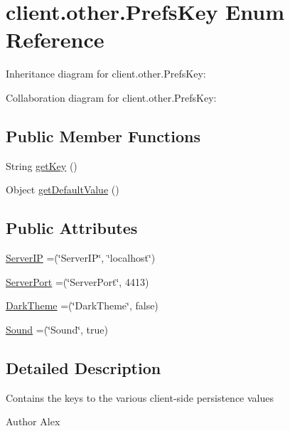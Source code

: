 \hypertarget{enumclient_1_1other_1_1_prefs_key}{}\section{client.\+other.\+Prefs\+Key Enum Reference}
\label{enumclient_1_1other_1_1_prefs_key}


Inheritance diagram for client.\+other.\+Prefs\+Key\+:


Collaboration diagram for client.\+other.\+Prefs\+Key\+:
\subsection*{Public Member Functions}
\begin{DoxyCompactItemize}
\item 
String \hyperlink{enumclient_1_1other_1_1_prefs_key_a204beaf7ef2607c5ee052bf712d5fc66}{get\+Key} ()
\item 
Object \hyperlink{enumclient_1_1other_1_1_prefs_key_a7d50bec7ffef68ca2b9657cc4a8b271f}{get\+Default\+Value} ()
\end{DoxyCompactItemize}
\subsection*{Public Attributes}
\begin{DoxyCompactItemize}
\item 
\hyperlink{enumclient_1_1other_1_1_prefs_key_afb3297cc8cba1e49ec031c14e115feb8}{Server\+IP} =(\char`\"{}Server\+IP\char`\"{}, \char`\"{}localhost\char`\"{})
\item 
\hyperlink{enumclient_1_1other_1_1_prefs_key_a967610c3389ceac5034551d3f69c564c}{Server\+Port} =(\char`\"{}Server\+Port\char`\"{}, 4413)
\item 
\hyperlink{enumclient_1_1other_1_1_prefs_key_a1712884dcd2b70030aa4e9baadfc5d65}{Dark\+Theme} =(\char`\"{}Dark\+Theme\char`\"{}, false)
\item 
\hyperlink{enumclient_1_1other_1_1_prefs_key_a8ad253d1a3c77e65df307909afb7f52f}{Sound} =(\char`\"{}Sound\char`\"{}, true)
\end{DoxyCompactItemize}


\subsection{Detailed Description}
Contains the keys to the various client-\/side persistence values \begin{DoxyAuthor}{Author}
Alex 
\end{DoxyAuthor}


